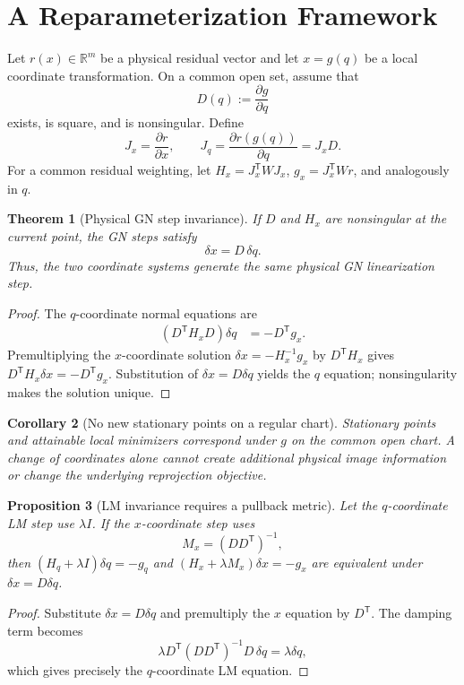 \documentclass[11pt,a4paper]{article}
\newtheorem{theorem}{Theorem}
\newtheorem{proposition}[theorem]{Proposition}
\newtheorem{corollary}[theorem]{Corollary}
\theoremstyle{definition}
\theoremstyle{remark}
\newcommand{\R}{\mathbb{R}}
\newcommand{\T}{\mathsf{T}}
\begin{document}
\section{A Reparameterization Framework}
\label{sec:framework}
Let $r(x)\in\R^m$ be a physical residual vector and let $x=g(q)$ be a local coordinate transformation. On a common open set, assume that
\begin{equation}
  D(q) := \frac{\partial g}{\partial q}
\end{equation}
exists, is square, and is nonsingular. Define
\begin{equation}
  J_x=\frac{\partial r}{\partial x},\qquad
  J_q=\frac{\partial r(g(q))}{\partial q}=J_xD.
\end{equation}
For a common residual weighting, let $H_x=J_x^\T WJ_x$, $g_x=J_x^\T Wr$, and analogously in $q$.

\begin{theorem}[Physical GN step invariance]
\label{thm:gn}
If $D$ and $H_x$ are nonsingular at the current point, the GN steps satisfy
\begin{equation}
  \boxed{\delta x=D\,\delta q.}
\end{equation}
Thus, the two coordinate systems generate the same physical GN linearization step.
\end{theorem}
\begin{proof}
The $q$-coordinate normal equations are
\begin{align}
  (D^\T H_xD)\delta q
    &=-D^\T g_x.
\end{align}
Premultiplying the $x$-coordinate solution $\delta x=-H_x^{-1}g_x$ by $D^\T H_x$ gives
$D^\T H_x\delta x=-D^\T g_x$. Substitution of $\delta x=D\delta q$ yields the $q$ equation; nonsingularity makes the solution unique.
\end{proof}

\begin{corollary}[No new stationary points on a regular chart]
Stationary points and attainable local minimizers correspond under $g$ on the common open chart. A change of coordinates alone cannot create additional physical image information or change the underlying reprojection objective.
\end{corollary}

\begin{proposition}[LM invariance requires a pullback metric]
\label{prop:lm}
Let the $q$-coordinate LM step use $\lambda I$. If the $x$-coordinate step uses
\begin{equation}
  M_x=(DD^\T)^{-1},
\end{equation}
then $(H_q+\lambda I)\delta q=-g_q$ and $(H_x+\lambda M_x)\delta x=-g_x$ are equivalent under $\delta x=D\delta q$.
\end{proposition}
\begin{proof}
Substitute $\delta x=D\delta q$ and premultiply the $x$ equation by $D^\T$. The damping term becomes
\begin{equation}
  \lambda D^\T(DD^\T)^{-1}D\,\delta q=\lambda\delta q,
\end{equation}
which gives precisely the $q$-coordinate LM equation.
\end{proof}
\end{document}
